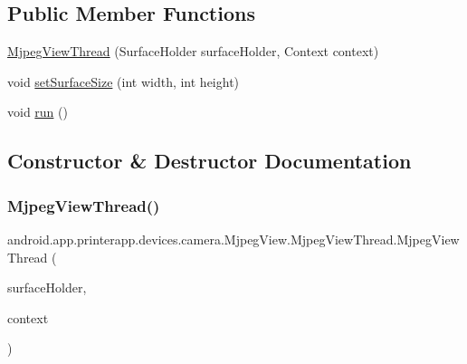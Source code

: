 \subsection*{Public Member Functions}
\begin{DoxyCompactItemize}
\item 
\hyperlink{classandroid_1_1app_1_1printerapp_1_1devices_1_1camera_1_1_mjpeg_view_1_1_mjpeg_view_thread_a3c568050ea0d3726b4c5ed88d34d390a}{Mjpeg\+View\+Thread} (Surface\+Holder surface\+Holder, Context context)
\item 
void \hyperlink{classandroid_1_1app_1_1printerapp_1_1devices_1_1camera_1_1_mjpeg_view_1_1_mjpeg_view_thread_a19f34eef0acd5541b6841e86cad631c5}{set\+Surface\+Size} (int width, int height)
\item 
void \hyperlink{classandroid_1_1app_1_1printerapp_1_1devices_1_1camera_1_1_mjpeg_view_1_1_mjpeg_view_thread_af65f822d9f424c5a8f5426e1039de55a}{run} ()
\end{DoxyCompactItemize}


\subsection{Constructor \& Destructor Documentation}
\mbox{\label{classandroid_1_1app_1_1printerapp_1_1devices_1_1camera_1_1_mjpeg_view_1_1_mjpeg_view_thread_a3c568050ea0d3726b4c5ed88d34d390a}} 
\subsubsection{\texorpdfstring{Mjpeg\+View\+Thread()}{MjpegViewThread()}}
{\footnotesize\ttfamily android.\+app.\+printerapp.\+devices.\+camera.\+Mjpeg\+View.\+Mjpeg\+View\+Thread.\+Mjpeg\+View\+Thread (\begin{DoxyParamCaption}\item[{Surface\+Holder}]{surface\+Holder,  }\item[{Context}]{context }\end{DoxyParamCaption})}



